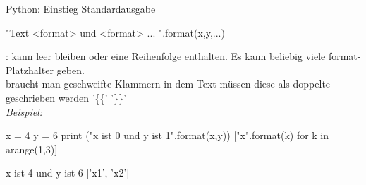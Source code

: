 \documentclass[hyperref={xetex}]{beamer}
\begin{document}
\begin{frame}[fragile]{Python: Einstieg Standardausgabe}
\begin{pyin}
"Text {<format>} und {<format>} ... ".format(x,y,...)
\end{pyin}
: kann leer bleiben oder eine Reihenfolge enthalten.  Es kann beliebig viele format-Platzhalter geben. \\
braucht man geschweifte Klammern in dem Text müssen diese als doppelte geschrieben werden '\{\{' '\}\}' \\
\emph{Beispiel:}
\begin{pyin}
x = 4
y = 6
print ("x ist {0} und y ist {1}".format(x,y))
["x{}".format(k) for k in arange(1,3)]
\end{pyin}
\begin{pyout}
x ist 4 und y ist 6
['x1', 'x2']
\end{pyout}

\end{frame}
         
\end{document}
